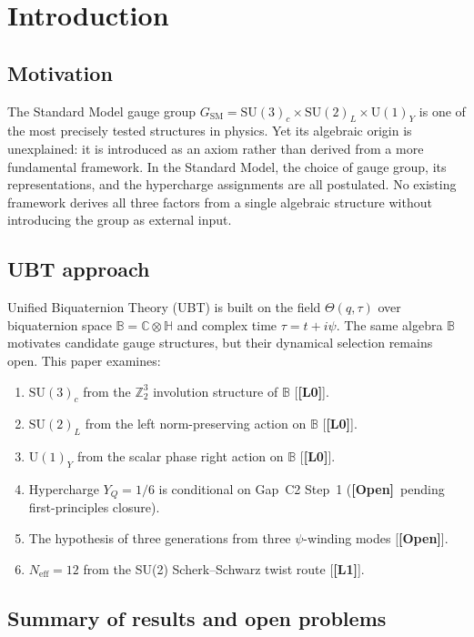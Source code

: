 \documentclass[12pt,a4paper]{article}
\theoremstyle{definition}
\theoremstyle{remark}
\newcommand{\OPEN}{\textbf{[Open]}}
\newcommand{\SU}[1]{\mathrm{SU}(#1)}
\newcommand{\UU}[1]{\mathrm{U}(#1)}
\newcommand{\Bq}{\mathbb{C}\otimes\mathbb{H}}
\newcommand{\Lone}{\textbf{[L1]}}
\newcommand{\Lzero}{\textbf{[L0]}}
\begin{document}
\section{Introduction}
\label{sec:intro}

\subsection{Motivation}

The Standard Model gauge group
$G_{\mathrm{SM}} = \SU{3}_c\times\SU{2}_L\times\UU{1}_Y$
is one of the most precisely tested structures in physics.
Yet its algebraic origin is unexplained: it is introduced as an axiom
rather than derived from a more fundamental framework.
In the Standard Model, the choice of gauge group, its representations,
and the hypercharge assignments are all postulated.
No existing framework derives all three factors from a single algebraic
structure without introducing the group as external input.

\subsection{UBT approach}

Unified Biquaternion Theory (UBT) \cite{jaros2026gr} is built on the field
$\Theta(q,\tau)$ over biquaternion space $\mathbb{B} = \Bq$
and complex time $\tau = t + i\psi$.
The same algebra $\mathbb{B}$ motivates candidate gauge structures,
but their dynamical selection remains open.
This paper examines:
\begin{enumerate}
\item $\SU{3}_c$ from the $\mathbb{Z}_2^3$ involution structure of $\mathbb{B}$ [\Lzero].
\item $\SU{2}_L$ from the left norm-preserving action on $\mathbb{B}$ [\Lzero].
\item $\UU{1}_Y$ from the scalar phase right action on $\mathbb{B}$ [\Lzero].
\item Hypercharge $Y_Q = 1/6$ is conditional on Gap~C2 Step~1
      (\OPEN\ pending first-principles closure).
\item The hypothesis of three generations from three $\psi$-winding modes [\OPEN].
\item $N_{\mathrm{eff}} = 12$ from the SU(2) Scherk--Schwarz twist route [\Lone].
\end{enumerate}

\subsection{Summary of results and open problems}
\end{document}
